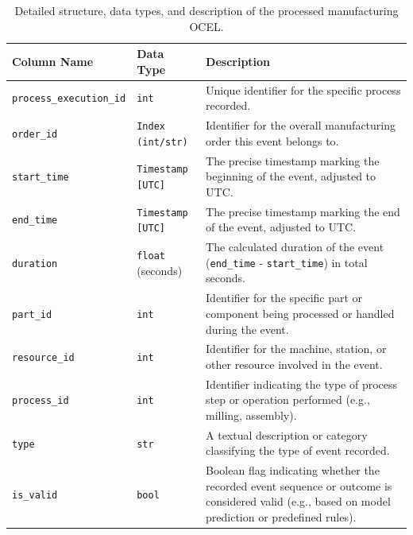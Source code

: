 \begin{table}[htbp]
  \centering
  \caption{Detailed structure, data types, and description of the processed manufacturing OCEL.}
  \label{tab:output_structure_detailed}
  \begin{tabular}{l l p{6cm}} %
    \toprule
    \textbf{Column Name}            & \textbf{Data Type}       & \textbf{Description}                                                                                                                              \\
    \midrule
    \texttt{process\_execution\_id} & \texttt{int}             & Unique identifier for the specific process recorded.                                                                                              \\
    \texttt{order\_id}              & \texttt{Index (int/str)} & Identifier for the overall manufacturing order this event belongs to.                                                                             \\
    \texttt{start\_time}            & \texttt{Timestamp [UTC]} & The precise timestamp marking the beginning of the event, adjusted to UTC.                                                                        \\
    \texttt{end\_time}              & \texttt{Timestamp [UTC]} & The precise timestamp marking the end of the event, adjusted to UTC.                                                                              \\
    \texttt{duration}               & \texttt{float} (seconds) & The calculated duration of the event (\texttt{end\_time} - \texttt{start\_time}) in total seconds.                                                \\
    \texttt{part\_id}               & \texttt{int}             & Identifier for the specific part or component being processed or handled during the event.                                                        \\
    \texttt{resource\_id}           & \texttt{int}             & Identifier for the machine, station, or other resource involved in the event.                                                                     \\
    \texttt{process\_id}            & \texttt{int}             & Identifier indicating the type of process step or operation performed (e.g., milling, assembly).                                                  \\
    \texttt{type}                   & \texttt{str}             & A textual description or category classifying the type of event recorded.                                                                         \\
    \texttt{is\_valid}              & \texttt{bool}            & Boolean flag indicating whether the recorded event sequence or outcome is considered valid (e.g., based on model prediction or predefined rules). \\
    \bottomrule
  \end{tabular}
\end{table}

